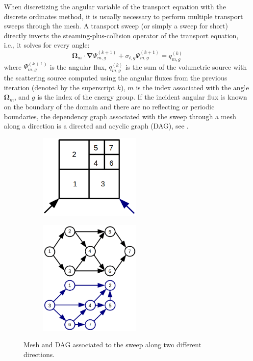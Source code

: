 \documentclass{mc2015}
\newcommand\bn{\boldsymbol{\nabla}}
\newcommand\bo{\boldsymbol{\Omega}}
\renewcommand{\(}{\left(}
\renewcommand{\)}{\right)}
\renewcommand{\[}{\left[}
\renewcommand{\]}{\right]}
\begin{document}
When discretizing the angular variable of the transport equation with the
discrete ordinates method, it is usually necessary to perform multiple transport
sweeps through the mesh. A transport sweep (or simply a sweep for short)
directly inverts the steaming-plus-collision operator of the transport equation,
i.e., it solves for every angle:
\begin{equation}
  \bo_m\cdot\bn\Psi_{m,g}^{(k+1)}+\sigma_{t,g}\Psi_{m,g}^{(k+1)} =
  q_{m,g}^{(k)}
  \label{task}
\end{equation}
where $\Psi_{m,g}^{(k+1)}$ is the angular flux, $q_{m,g}^{(k)}$
is the sum of the volumetric source with the scattering source computed using
the angular fluxes from the
previous iteration (denoted by the superscript $k$), $m$ is the index associated
with the angle $\bo_m$, and $g$ is the index of the energy group. If the
incident angular flux is known on the boundary of the domain and there are no
reflecting or periodic boundaries, the dependency graph associated with the
sweep through a mesh along a direction is a directed and acyclic graph (DAG),
see .
\begin{figure}[H]
  \begin{subfigure}[c]{.5\textwidth}
    \centering
    \includegraphics[width=5cm]{task_1}
  \end{subfigure}
  \begin{subfigure}[c]{.5\textwidth}
    \centering
    \includegraphics[width=5cm]{task_2}
  \end{subfigure}
  \caption{Mesh and DAG associated to the sweep along two different directions.}
  \label{tasks}
\end{figure}
\end{document}
